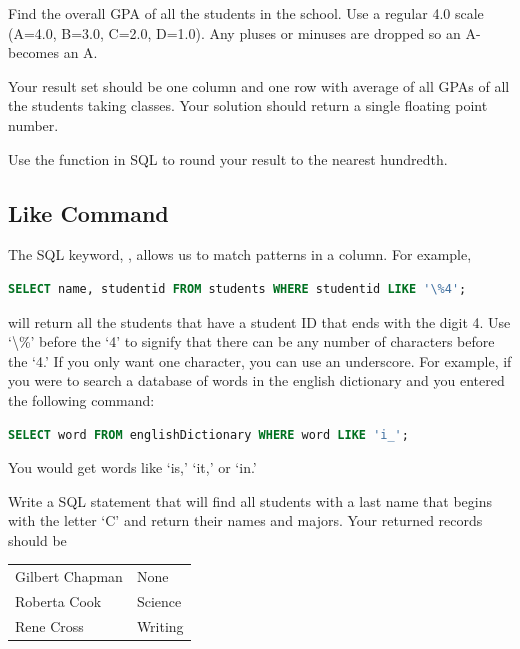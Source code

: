 \begin{problem}
Find the overall GPA of all the students in the school.
Use a regular 4.0 scale (A=4.0, B=3.0, C=2.0, D=1.0).
Any pluses or minuses are dropped so an A- becomes an A.

Your result set should be one column and one row with average of all GPAs of all the students taking classes.
Your solution should return a single floating point number.

Use the  function in SQL to round your result to the nearest hundredth.
\label{prob:studentGPA}
\end{problem}

\subsection*{Like Command}
The SQL keyword, , allows us to match patterns in a column.
For example,
\begin{lstlisting}[language=SQL]
SELECT name, studentid FROM students WHERE studentid LIKE '\%4';
\end{lstlisting}
will return all the students that have a student ID that ends with the digit 4.
Use `\textbackslash\%' before the `4' to signify that there can be any number of characters before the `4.'
If you only want one character, you can use an underscore.
For example, if you were to search a database of words in the english dictionary and you entered the following command:
\begin{lstlisting}[language=SQL]
SELECT word FROM englishDictionary WHERE word LIKE 'i_';
\end{lstlisting}
You would get words like `is,' `it,' or `in.'


\begin{problem}
Write a SQL statement that will find all students with a last name that begins with the letter `C' and return their names and majors.  Your returned records should be
\begin{table}[H]
\begin{tabular}{|l|l|}
\hline
Gilbert Chapman & None \\
Roberta Cook & Science \\
Rene Cross & Writing \\
\hline
\end{tabular}
\label{table:likec_solution}
\end{table}
\label{prob:likec}
\end{problem}

\let\undefined\lsql
